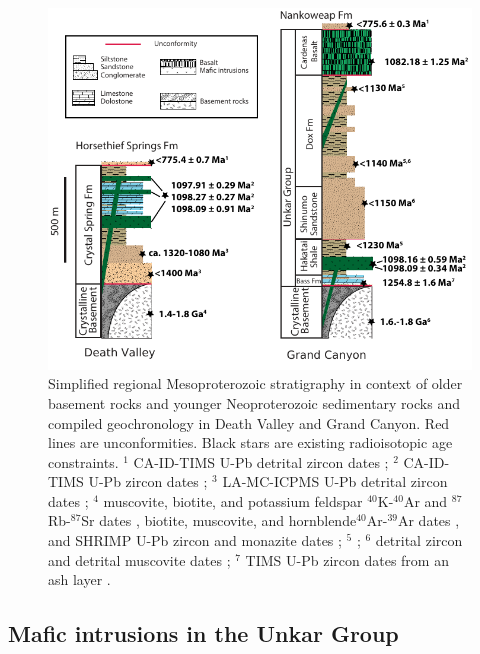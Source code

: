\begin{figure}[h!]
\centering
\includegraphics[width=\textwidth]{figure/Zhang2024b/DV_GC_Mesoproterozoic_strat_columns.pdf}
\caption{\footnotesize Simplified regional Mesoproterozoic stratigraphy in context of older basement rocks and younger Neoproterozoic sedimentary rocks and compiled geochronology in Death Valley and Grand Canyon. Red lines are unconformities. Black stars are existing radioisotopic age constraints. $^1$ CA-ID-TIMS U-Pb detrital zircon dates \cite{Dehler2023a}; $^2$ CA-ID-TIMS U-Pb zircon dates \cite{Mohr2024a}; $^3$ LA-MC-ICPMS U-Pb detrital zircon dates \cite{Mahon2014b}; $^4$ muscovite, biotite, and potassium feldspar $^{40}$K-$^{40}$Ar and $^{87}$Rb-$^{87}$Sr dates \cite{Lanphere1964b}, biotite, muscovite, and hornblende$^{40}$Ar-$^{39}$Ar dates , and SHRIMP U-Pb zircon and monazite dates ; $^5$ ; $^6$ detrital zircon and detrital muscovite dates ; $^7$ TIMS U-Pb zircon dates from an ash layer .}
\label{fig:DV_GC_strat_columns}
\end{figure}

\subsection*{Mafic intrusions in the Unkar Group}

